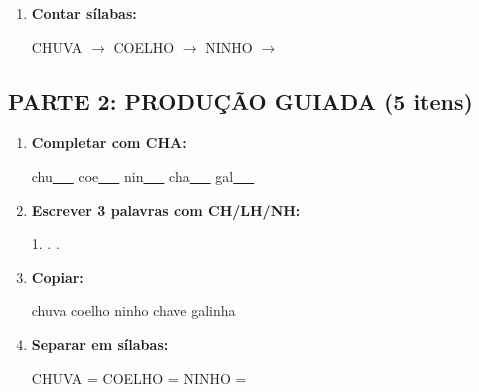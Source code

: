 \begin{exercicio}
\begin{enumerate}
  \item \textbf{Contar sílabas:}
  \begin{center}
  CHUVA $\rightarrow$ \underline{\hspace{0.9cm}} \quad COELHO $\rightarrow$ \underline{\hspace{0.9cm}} \quad NINHO $\rightarrow$ \underline{\hspace{0.9cm}}
  \end{center}

\end{enumerate}

\subsection*{PARTE 2: PRODUÇÃO GUIADA (5 itens)}

\begin{enumerate}[resume]

  \item \textbf{Completar com CHA:}
  \begin{center}
  chu\underline{~~~} \quad coe\underline{~~~} \quad nin\underline{~~~} \quad cha\underline{~~~} \quad gal\underline{~~~}
  \end{center}

  \item \textbf{Escrever 3 palavras com CH/LH/NH:}
  \begin{center}
  1. \underline{\hspace{3cm}} . \underline{\hspace{3cm}} . \underline{\hspace{3cm}}
  \end{center}

  \item \textbf{Copiar:}
  \begin{center}
  chuva \quad coelho \quad ninho \quad chave \quad galinha
  \end{center}

  \item \textbf{Separar em sílabas:}
  \begin{center}
  CHUVA = \underline{\hspace{1cm}} \underline{\hspace{1cm}} \quad COELHO = \underline{\hspace{1cm}} \underline{\hspace{1cm}} \quad NINHO = \underline{\hspace{1cm}} \underline{\hspace{1cm}}
  \end{center}


\end{enumerate}
\end{exercicio}
